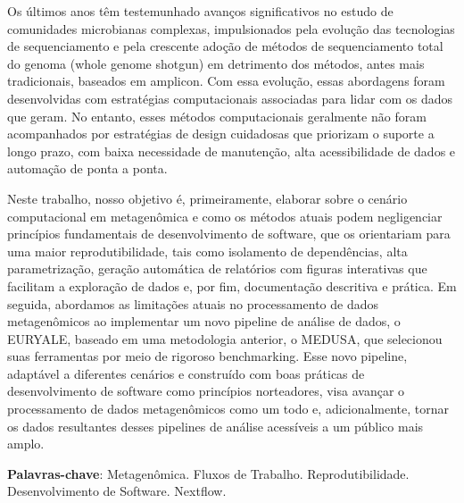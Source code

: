\documentclass[
	12pt,				%
	oneside,			%
	a4paper,			%
	chapter=TITLE,		%
	section=TITLE,		%
	english,			%
	brazil				%
	]{abntex2}
\begin{document}

\setlength{\absparsep}{18pt} %
\begin{resumo}
	\SingleSpacing
  Os últimos anos têm testemunhado avanços significativos no estudo de comunidades microbianas complexas, impulsionados pela evolução das tecnologias de sequenciamento e pela crescente adoção de métodos de sequenciamento total do genoma (whole genome shotgun) em detrimento dos métodos, antes mais tradicionais, baseados em amplicon. Com essa evolução, essas abordagens foram desenvolvidas com estratégias computacionais associadas para lidar com os dados que geram. No entanto, esses métodos computacionais geralmente não foram acompanhados por estratégias de design cuidadosas que priorizam o suporte a longo prazo, com baixa necessidade de manutenção, alta acessibilidade de dados e automação de ponta a ponta.

  Neste trabalho, nosso objetivo é, primeiramente, elaborar sobre o cenário computacional em metagenômica e como os métodos atuais podem negligenciar princípios fundamentais de desenvolvimento de software, que os orientariam para uma maior reprodutibilidade, tais como isolamento de dependências, alta parametrização, geração automática de relatórios com figuras interativas que facilitam a exploração de dados e, por fim, documentação descritiva e prática. Em seguida, abordamos as limitações atuais no processamento de dados metagenômicos ao implementar um novo pipeline de análise de dados, o EURYALE, baseado em uma metodologia anterior, o MEDUSA, que selecionou suas ferramentas por meio de rigoroso benchmarking. Esse novo pipeline, adaptável a diferentes cenários e construído com boas práticas de desenvolvimento de software como princípios norteadores, visa avançar o processamento de dados metagenômicos como um todo e, adicionalmente, tornar os dados resultantes desses pipelines de análise acessíveis a um público mais amplo.

  \textbf{Palavras-chave}:
    Metagenômica.
    Fluxos de Trabalho.
    Reprodutibilidade.
    Desenvolvimento de Software.
    Nextflow.
  \end{resumo}
\end{document}
